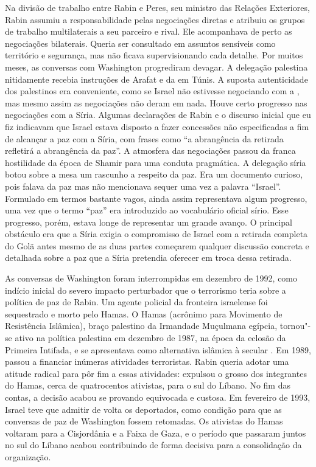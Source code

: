 Na divisão de trabalho entre Rabin e Peres, seu ministro das Relações
Exteriores, Rabin assumiu a responsabilidade pelas negociações diretas e
atribuiu os grupos de trabalho multilaterais a seu parceiro e rival.
Ele acompanhava de perto as negociações bilaterais. Queria ser
consultado em assuntos sensíveis como território e segurança, mas não
ficava supervisionando cada detalhe. Por muitos meses, as conversas com
Washington progrediram devagar. A delegação palestina nitidamente
recebia instruções de Arafat e da  em Túnis. A suposta autenticidade
dos palestinos era conveniente, como se Israel não estivesse negociando
com a , mas mesmo assim as negociações não deram em nada. Houve certo
progresso nas negociações com a Síria. Algumas declarações de Rabin e o
discurso inicial que eu fiz indicavam que Israel estava disposto a fazer
concessões não especificadas a fim de alcançar a paz com a Síria, com
frases como ``a abrangência da retirada refletirá a abrangência da
paz''. A atmosfera das negociações passou da franca hostilidade da época
de Shamir para uma conduta pragmática. A delegação síria botou sobre a
mesa um rascunho a respeito da paz. Era um documento curioso, pois
falava da paz mas não mencionava sequer uma vez a palavra ``Israel''.
Formulado em termos bastante vagos, ainda assim representava algum
progresso, uma vez que o termo ``paz'' era introduzido ao vocabulário
oficial sírio. Esse progresso, porém, estava longe de representar um
grande avanço. O principal obstáculo era que a Síria exigia o
compromisso de Israel com a retirada completa do Golã antes mesmo de as
duas partes começarem qualquer discussão concreta e detalhada sobre a
paz que a Síria pretendia oferecer em troca dessa retirada.

As conversas de Washington foram interrompidas em dezembro de 1992, como
indício inicial do severo impacto perturbador que o terrorismo teria
sobre a política de paz de Rabin. Um agente policial da fronteira
israelense foi sequestrado e morto pelo Hamas. O Hamas (acrônimo para
Movimento de Resistência Islâmica), braço palestino da Irmandade
Muçulmana egípcia, tornou"-se ativo na política palestina em dezembro de
1987, na época da eclosão da Primeira Intifada, e se apresentava como
alternativa islâmica à secular . Em 1989, passou a financiar inúmeras
atividades terroristas. Rabin queria adotar uma atitude radical para pôr
fim a essas atividades: expulsou o grosso dos integrantes do Hamas,
cerca de quatrocentos ativistas, para o sul do Líbano. No fim das
contas, a decisão acabou se provando equivocada e custosa. Em fevereiro
de 1993, Israel teve que admitir de volta os deportados, como condição
para que as conversas de paz de Washington fossem retomadas. Os
ativistas do Hamas voltaram para a Cisjordânia e a Faixa de Gaza, e o
período que passaram juntos no sul do Líbano acabou contribuindo de
forma decisiva para a consolidação da organização.


